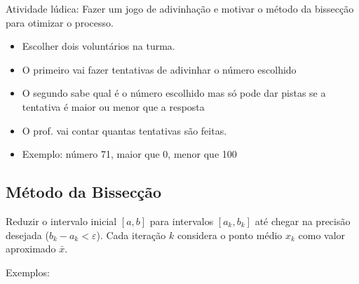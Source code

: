 \documentclass[a4paper]{article}
\begin{document}
Atividade lúdica: Fazer um jogo de adivinhação e motivar o método da
bissecção para otimizar o processo.


\begin{itemize}
\item Escolher dois voluntários na turma.
\item O primeiro vai fazer tentativas de adivinhar o número escolhido
\item O segundo sabe qual é o número escolhido mas só pode dar pistas
  se a tentativa é maior ou menor que a resposta
\item O prof. vai contar quantas tentativas são feitas.
\item Exemplo: número 71, maior que 0, menor que 100
\end{itemize}

\clearpage
\subsection*{Método da Bissecção}

Reduzir o intervalo inicial $[a,b]$ para intervalos $[a_k,b_k]$ até
chegar na precisão desejada ($b_k - a_k < \varepsilon$). Cada iteração
$k$ considera o ponto médio $x_k$ como valor aproximado $\bar{x}$.

\bigskip
\begin{center}
\end{center}
\bigskip

Exemplos: 
\end{document}
